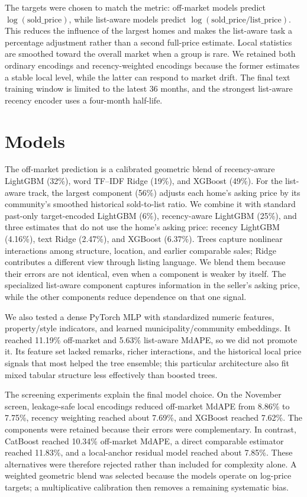 \documentclass[11pt]{article}
\begin{document}
The targets were chosen to match the metric: off-market models predict
$\log(\text{sold\_price})$, while list-aware models predict
$\log(\text{sold\_price}/\text{list\_price})$.  This reduces the influence of
the largest homes and makes the list-aware task a percentage adjustment rather
than a second full-price estimate.  Local statistics are smoothed toward the
overall market when a group is rare.  We retained both ordinary encodings and
recency-weighted encodings because the former estimates a stable local level,
while the latter can respond to market drift.  The final text training window
is limited to the latest 36 months, and the strongest list-aware recency
encoder uses a four-month half-life.

\section{Models}
The off-market prediction is a calibrated geometric blend of recency-aware
LightGBM (32\%), word TF--IDF Ridge (19\%), and XGBoost (49\%).  For the
list-aware track, the largest component (56\%) adjusts each home's asking
price by its community's smoothed historical sold-to-list ratio.  We combine
it with standard past-only target-encoded LightGBM (6\%), recency-aware
LightGBM (25\%), and three estimates that do not use the home's asking price:
recency LightGBM (4.16\%), text Ridge (2.47\%), and XGBoost (6.37\%).  Trees capture nonlinear interactions among
structure, location, and earlier comparable sales; Ridge contributes a
different view through listing language.  We blend them because their errors
are not identical, even when a component is weaker by itself.  The specialized
list-aware component captures information in the seller's asking price, while
the other components reduce dependence on that one signal.

We also tested a dense PyTorch MLP with standardized numeric features,
property/style indicators, and learned municipality/community embeddings.  It
reached 11.19\% off-market and 5.63\% list-aware MdAPE, so we did not promote it.
Its feature set lacked remarks, richer interactions, and the historical local
price signals that most helped the tree ensemble; this particular architecture
also fit mixed tabular structure less effectively than boosted trees.

The screening experiments explain the final model choice.  On the November
screen, leakage-safe local encodings reduced off-market MdAPE from 8.86\% to
7.75\%, recency weighting reached about 7.69\%, and XGBoost reached 7.62\%.
The components were retained because their errors were complementary.  In
contrast, CatBoost reached 10.34\% off-market MdAPE, a direct comparable
estimator reached 11.83\%, and a local-anchor residual model reached about
7.85\%.  These alternatives were therefore rejected rather than included for
complexity alone.  A weighted geometric blend was selected because the models
operate on log-price targets; a multiplicative calibration then removes a
remaining systematic bias.
\end{document}
